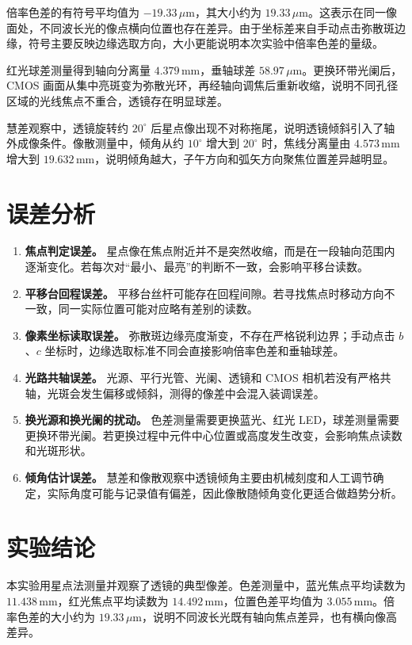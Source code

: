 \documentclass[12pt,a4paper]{article}
\begin{document}
倍率色差的有符号平均值为 $-19.33\,\mu\mathrm{m}$，其大小约为 $19.33\,\mu\mathrm{m}$。这表示在同一像面处，不同波长光的像点横向位置也存在差异。由于坐标差来自手动点击弥散斑边缘，符号主要反映边缘选取方向，大小更能说明本次实验中倍率色差的量级。

红光球差测量得到轴向分离量 $4.379\,\mathrm{mm}$，垂轴球差 $58.97\,\mu\mathrm{m}$。更换环带光阑后，CMOS 画面从集中亮斑变为弥散光环，再经轴向调焦后重新收缩，说明不同孔径区域的光线焦点不重合，透镜存在明显球差。

慧差观察中，透镜旋转约 $20^\circ$ 后星点像出现不对称拖尾，说明透镜倾斜引入了轴外成像条件。像散测量中，倾角从约 $10^\circ$ 增大到 $20^\circ$ 时，焦线分离量由 $4.573\,\mathrm{mm}$ 增大到 $19.632\,\mathrm{mm}$，说明倾角越大，子午方向和弧矢方向聚焦位置差异越明显。

\section{误差分析}

\begin{enumerate}
  \item \textbf{焦点判定误差。} 星点像在焦点附近并不是突然收缩，而是在一段轴向范围内逐渐变化。若每次对“最小、最亮”的判断不一致，会影响平移台读数。
  \item \textbf{平移台回程误差。} 平移台丝杆可能存在回程间隙。若寻找焦点时移动方向不一致，同一实际位置可能对应略有差别的读数。
  \item \textbf{像素坐标读取误差。} 弥散斑边缘亮度渐变，不存在严格锐利边界；手动点击 $b$、$c$ 坐标时，边缘选取标准不同会直接影响倍率色差和垂轴球差。
  \item \textbf{光路共轴误差。} 光源、平行光管、光阑、透镜和 CMOS 相机若没有严格共轴，光斑会发生偏移或倾斜，测得的像差中会混入装调误差。
  \item \textbf{换光源和换光阑的扰动。} 色差测量需要更换蓝光、红光 LED，球差测量需要更换环带光阑。若更换过程中元件中心位置或高度发生改变，会影响焦点读数和光斑形状。
  \item \textbf{倾角估计误差。} 慧差和像散观察中透镜倾角主要由机械刻度和人工调节确定，实际角度可能与记录值有偏差，因此像散随倾角变化更适合做趋势分析。
\end{enumerate}

\section{实验结论}

本实验用星点法测量并观察了透镜的典型像差。色差测量中，蓝光焦点平均读数为 $11.438\,\mathrm{mm}$，红光焦点平均读数为 $14.492\,\mathrm{mm}$，位置色差平均值为 $3.055\,\mathrm{mm}$。倍率色差的大小约为 $19.33\,\mu\mathrm{m}$，说明不同波长光既有轴向焦点差异，也有横向像高差异。
\end{document}
